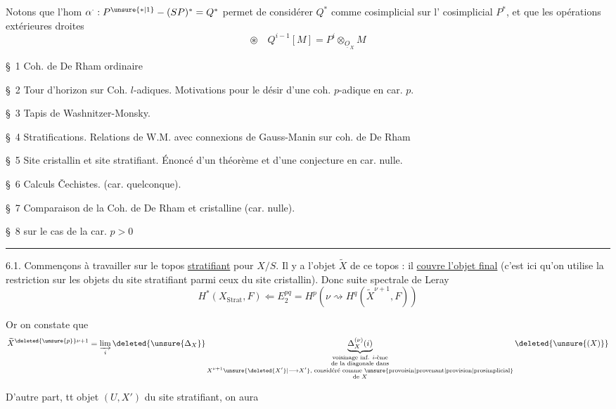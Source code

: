 
Notons que l'hom $\alpha^{\cdot}:P^{\unsure{*|1}}\mathbin{-}(SP)^*=Q^*$ permet de considérer $Q^*$ comme    cosimplicial sur l' cosimplicial $P^*$, et que les opérations extérieures droites
\[
\boxed{\circledast\quad Q^{i-1}[M]=P^i\otimes_{\underline O_X} M}
\]

\S~1 Coh. de De Rham ordinaire

\S~2 Tour d'horizon sur Coh. $l$-adiques. Motivations pour le désir d'une coh. $p$-adique en car. $p$.

\S~3 Tapis de Washnitzer-Monsky.

\S~4 Stratifications. Relations de W.M. avec connexions de Gauss-Manin sur coh. de De Rham

\S~5  Site cristallin et site stratifiant. Énoncé  d'un théorème et d'une conjecture en car. nulle.

\S~6 Calculs Čechistes. (car. quelconque).

\S~7 Comparaison de la Coh. de De Rham et cristalline (car. nulle).

\S~8   sur le cas de la car. $p>0$

\noindent\rule{\linewidth}{.4pt}


6.1. Commençons à travailler sur le topos \uline{stratifiant} pour $X/S$. Il y a l'objet $\widetilde X$ de ce topos : il \uline{couvre l'objet final} (c'est ici qu'on utilise la restriction sur les objets du site stratifiant parmi ceux du site cristallin). Donc suite spectrale de Leray
\[
H^*(X_{\mathrm{Strat}},F)\Longleftarrow E^{pq}_2=H^p(\nu\rightsquigarrow H^q(\widetilde X^{\nu+1},F))
\]

Or on constate que
\[
\widetilde X^{\deleted{\unsure{p}}\nu+1}=\varinjlim_i\deleted{\unsure{\Delta_X}}\underbrace{\Delta^{(\nu)}_X(i)}_{\substack{\text{voisinage inf. $i$-ème}\\\text{de la diagonale dans}\\ X^{\nu+1}\unsure{\deleted{X'}|\longrightarrow X'}\text{, considéré comme \unsure{provoisin|provenant|provision|prosimplicial}}\\\text{de }X}}\deleted{\unsure{(X)}}
\]

D'autre part,  tt objet $(U,X')$ 
du site stratifiant, on aura

